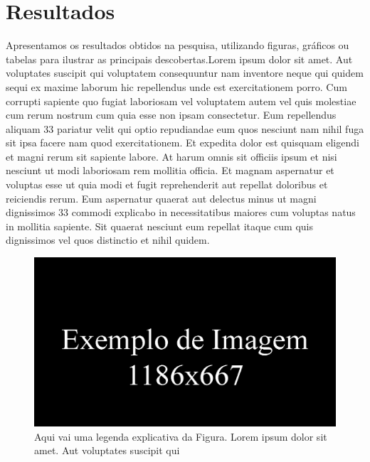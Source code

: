\documentclass[12pt]{article}
\begin{document}
\section{Resultados} %
Apresentamos os resultados obtidos na pesquisa, utilizando figuras, gráficos ou tabelas para ilustrar as principais descobertas.Lorem ipsum dolor sit amet. Aut voluptates suscipit qui voluptatem consequuntur nam inventore neque qui quidem sequi ex maxime laborum hic repellendus unde est exercitationem porro. Cum corrupti sapiente quo fugiat laboriosam vel voluptatem autem vel quis molestiae cum rerum nostrum cum quia esse non ipsam consectetur. Eum repellendus aliquam 33 pariatur velit qui optio repudiandae eum quos nesciunt nam nihil fuga sit ipsa facere nam quod exercitationem. Et expedita dolor est quisquam eligendi et magni rerum sit sapiente labore. At harum omnis sit officiis ipsum et nisi nesciunt ut modi laboriosam rem mollitia officia. Et magnam aspernatur et voluptas esse ut quia modi et fugit reprehenderit aut repellat doloribus et reiciendis rerum. Eum aspernatur quaerat aut delectus minus ut magni dignissimos 33 commodi explicabo in necessitatibus maiores cum voluptas natus in mollitia sapiente. Sit quaerat nesciunt eum repellat itaque cum quis dignissimos vel quos distinctio et nihil quidem.

\begin{figure}[H] %
  \centering
  \includegraphics[width=1\textwidth]{exemplo.png}
  \caption{Aqui vai uma legenda explicativa da Figura. Lorem ipsum dolor sit amet. Aut voluptates suscipit qui } %
  \label{fig:exemplo} %
\end{figure}
\end{document}
